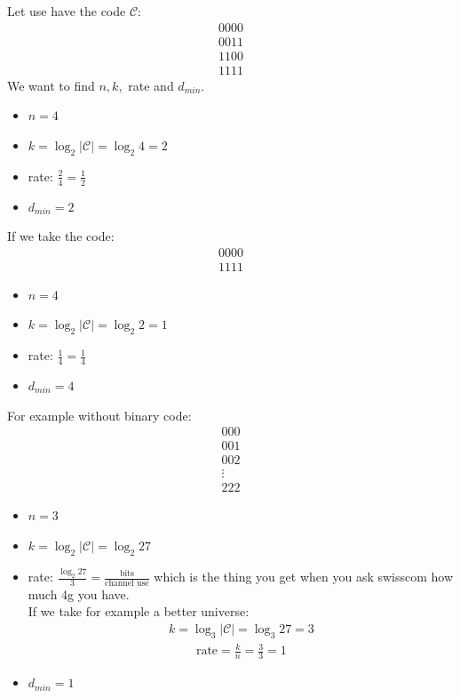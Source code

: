 
    Let use have the code $\mathcal{C}$:
    \begin{align*} 0000\\0011\\1100\\1111 \end{align*}
    We want to find $n, k, $ rate and $d_{min}$.
    \begin{itemize}
        \item $n = 4$
        \item $k = \log_2 \left|\mathcal{C}\right| = \log_2 4 = 2$
        \item rate: $\frac{2}{4} = \frac{1}{2}$
        \item $d_{min} = 2$
    \end{itemize}

    If we take the code:
    \begin{align*} 0000\\ 1111 \end{align*}
    \begin{itemize}
        \item $n = 4$
        \item $k = \log_2 \left|\mathcal{C}\right| = \log_2 2 = 1$
        \item rate: $\frac{1}{4} = \frac{1}{4}$
        \item $d_{min} = 4$
    \end{itemize}
 
    For example without binary code:
    \begin{align*} 000\\001\\002\\ \vdots\\ 222 \end{align*}
    \begin{itemize}
        \item $n = 3$
        \item $k = \log_2 \left|\mathcal{C}\right| = \log_2 27 $
        \item rate: $\frac{\log_2 27}{3} = \frac{\text{bits}}{\text{channel use}}$ which is the thing you get when you ask swisscom how much 4g you have.
\\ If we take for example a better universe: 
\begin{align*} k = \log_3 \left|\mathcal{C}\right| = \log_3 27 = 3
\end{align*}
\begin{align*} \text{rate} =  \frac{k}{n} = \frac{3}{3} =  1 \end{align*}
        \item $d_{min} = 1$
    \end{itemize}
 

